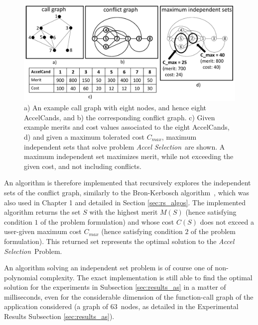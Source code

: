 \documentclass[]{usiinfthesis}
\newcommand{\candidates}{{AccelCand}s}
\newcommand{\asprobname}{\emph{Accel Selection}}
\newcommand{\numberOfcandidates}{{63}}
\begin{document}
\begin{figure}[!t]
  \centering
  \includegraphics[width=0.8\linewidth]{figs/max_set_examples.pdf}
  \caption{a) An example call graph with eight nodes, and hence
          eight \candidates, and b) the corresponding conflict graph.
          c) Given example merits and cost values associated to the eight
          \candidates, d) and given a maximum tolerated cost
          $C_{max}$, maximum independent sets that solve problem
          \asprobname\ are shown. A maximum independent set maximizes
          merit, while not exceeding the given cost, and not including
          conflicts.}
  \label{fig:max-set-examples}
\end{figure}

An algorithm is therefore implemented that recursively explores the
independent sets of the conflict graph, similarly to the Bron-Kerbosch
algorithm~\cite{BronKerbosch73}, which was also used in Chapter 1 and 
detailed in Section \ref{sec:rs_algos}. The implemented algorithm 
returns the set $S$ with the
highest merit $M(S)$ (hence satisfying condition $1$ of the problem
formulation) and whose cost $C(S)$ does not exceed a user-given
maximum cost $C_{max}$ (hence satisfying condition $2$ of the
problem formulation). This returned set represents the optimal
solution to the \asprobname\ Problem.\par

An algorithm solving an independent set problem is of course one of
non-polynomial complexity. The exact implementation is still able to
find the optimal solution for the experiments in Subsection \ref{sec:results_as} in a
matter of milliseconds, even for the considerable dimension of the
function-call graph of the application considered (a graph of 
\numberOfcandidates\ nodes, as detailed in the Experimental 
Results Subsection \ref{sec:results_as}).\par
\end{document}
